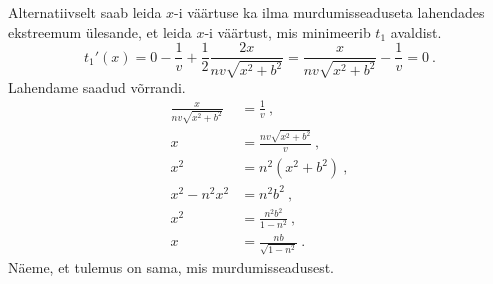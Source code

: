 Alternatiivselt saab leida \(x\)-i väärtuse ka ilma murdumisseaduseta lahendades ekstreemum ülesande, et leida \(x\)-i väärtust, mis minimeerib \(t_1\) avaldist.
\[
    t_1'(x) = 0 - \frac{1}{v} + \frac{1}{2} \frac{2x}{nv\sqrt{x^2 + b^2}} = \frac{x}{nv\sqrt{x^2 + b^2}} - \frac{1}{v} = 0 \ .
\]
Lahendame saadud võrrandi.
\begin{align*}
    \frac{x}{nv\sqrt{x^2 + b^2}} &= \frac{1}{v} \ , \\
    x &= \frac{nv\sqrt{x^2 + b^2}}{v} \ , \\
    x^2 &= n^2 (x^2 + b^2) \ , \\
    x^2 - n^2 x^2 &= n^2 b^2 \ , \\
    x^2 &= \frac{n^2 b^2}{1 - n^2} \ , \\
    x &= \frac{nb}{\sqrt{1 - n^2}} \ .
\end{align*}
Näeme, et tulemus on sama, mis murdumisseadusest.
\probend